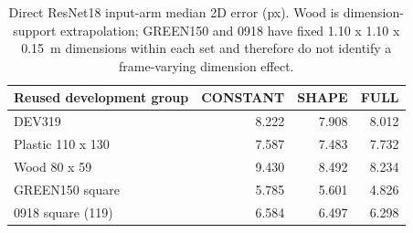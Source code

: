 \begin{table}[t]\centering\small
\caption{Direct ResNet18 input-arm median 2D error (px). Wood is dimension-support extrapolation; GREEN150 and 0918 have fixed 1.10 x 1.10 x 0.15~m dimensions within each set and therefore do not identify a frame-varying dimension effect.}\label{tab:resnetdimdirect}
\begin{tabular}{lrrr}\toprule
Reused development group & CONSTANT & SHAPE & FULL\\\midrule
DEV319 & 8.222 & 7.908 & 8.012\\
Plastic 110 x 130 & 7.587 & 7.483 & 7.732\\
Wood 80 x 59 & 9.430 & 8.492 & 8.234\\
GREEN150 square & 5.785 & 5.601 & 4.826\\
0918 square (119) & 6.584 & 6.497 & 6.298\\
\bottomrule\end{tabular}
\end{table}
